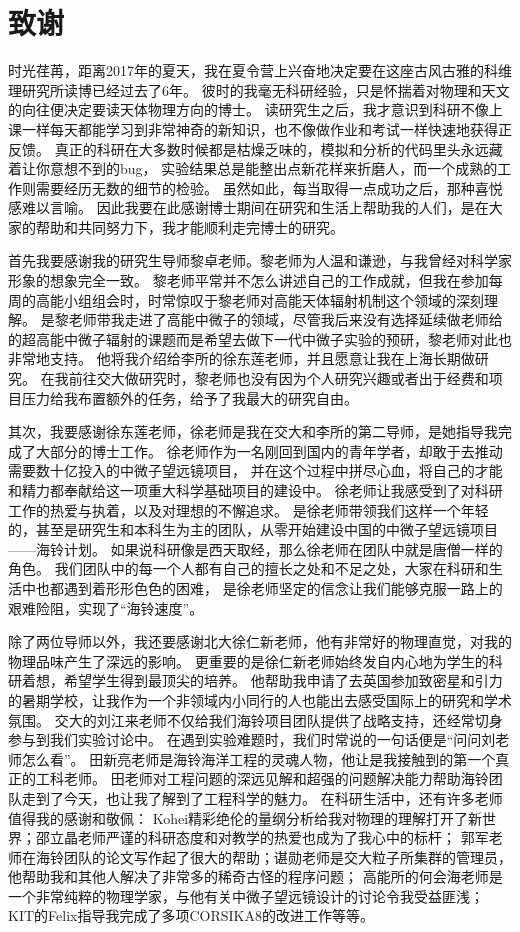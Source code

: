 \chapter{致谢}

时光荏苒，距离2017年的夏天，我在夏令营上兴奋地决定要在这座古风古雅的科维理研究所读博已经过去了6年。
彼时的我毫无科研经验，只是怀揣着对物理和天文的向往便决定要读天体物理方向的博士。
读研究生之后，我才意识到科研不像上课一样每天都能学习到非常神奇的新知识，也不像做作业和考试一样快速地获得正反馈。
真正的科研在大多数时候都是枯燥乏味的，模拟和分析的代码里头永远藏着让你意想不到的bug，
实验结果总是能整出点新花样来折磨人，而一个成熟的工作则需要经历无数的细节的检验。
虽然如此，每当取得一点成功之后，那种喜悦感难以言喻。
因此我要在此感谢博士期间在研究和生活上帮助我的人们，是在大家的帮助和共同努力下，我才能顺利走完博士的研究。

首先我要感谢我的研究生导师黎卓老师。黎老师为人温和谦逊，与我曾经对科学家形象的想象完全一致。
黎老师平常并不怎么讲述自己的工作成就，但我在参加每周的高能小组组会时，时常惊叹于黎老师对高能天体辐射机制这个领域的深刻理解。
是黎老师带我走进了高能中微子的领域，尽管我后来没有选择延续做老师给的超高能中微子辐射的课题而是希望去做下一代中微子实验的预研，黎老师对此也非常地支持。
他将我介绍给李所的徐东莲老师，并且愿意让我在上海长期做研究。
在我前往交大做研究时，黎老师也没有因为个人研究兴趣或者出于经费和项目压力给我布置额外的任务，给予了我最大的研究自由。

其次，我要感谢徐东莲老师，徐老师是我在交大和李所的第二导师，是她指导我完成了大部分的博士工作。
徐老师作为一名刚回到国内的青年学者，却敢于去推动需要数十亿投入的中微子望远镜项目，
并在这个过程中拼尽心血，将自己的才能和精力都奉献给这一项重大科学基础项目的建设中。
徐老师让我感受到了对科研工作的热爱与执着，以及对理想的不懈追求。
是徐老师带领我们这样一个年轻的，甚至是研究生和本科生为主的团队，从零开始建设中国的中微子望远镜项目——海铃计划。
如果说科研像是西天取经，那么徐老师在团队中就是唐僧一样的角色。
我们团队中的每一个人都有自己的擅长之处和不足之处，大家在科研和生活中也都遇到着形形色色的困难，
是徐老师坚定的信念让我们能够克服一路上的艰难险阻，实现了“海铃速度”。

除了两位导师以外，我还要感谢北大徐仁新老师，他有非常好的物理直觉，对我的物理品味产生了深远的影响。
更重要的是徐仁新老师始终发自内心地为学生的科研着想，希望学生得到最顶尖的培养。
他帮助我申请了去英国参加致密星和引力的暑期学校，让我作为一个非领域内小同行的人也能出去感受国际上的研究和学术氛围。
交大的刘江来老师不仅给我们海铃项目团队提供了战略支持，还经常切身参与到我们实验讨论中。
在遇到实验难题时，我们时常说的一句话便是“问问刘老师怎么看”。
田新亮老师是海铃海洋工程的灵魂人物，他让是我接触到的第一个真正的工科老师。
田老师对工程问题的深远见解和超强的问题解决能力帮助海铃团队走到了今天，也让我了解到了工程科学的魅力。
在科研生活中，还有许多老师值得我的感谢和敬佩：
Kohei精彩绝伦的量纲分析给我对物理的理解打开了新世界；邵立晶老师严谨的科研态度和对教学的热爱也成为了我心中的标杆；
郭军老师在海铃团队的论文写作起了很大的帮助；谌勋老师是交大粒子所集群的管理员，他帮助我和其他人解决了非常多的稀奇古怪的程序问题；
高能所的何会海老师是一个非常纯粹的物理学家，与他有关中微子望远镜设计的讨论令我受益匪浅；
KIT的Felix指导我完成了多项CORSIKA8的改进工作等等。

